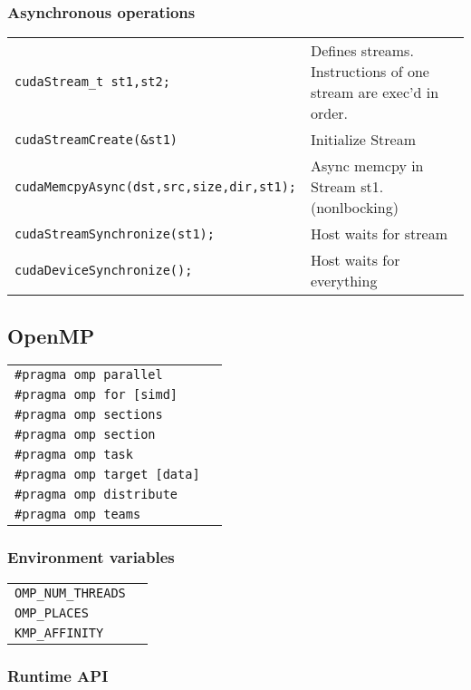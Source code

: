 \documentclass[11pt]{article}
\begin{document}
\subsubsection{Asynchronous operations}
\begin{tabular}{ p{7cm} l }
	\lstinline$cudaStream_t st1,st2;$ & Defines streams. Instructions of one stream are exec'd in order.\\
	\lstinline$cudaStreamCreate(&st1)$& Initialize Stream\\
	\lstinline$cudaMemcpyAsync(dst,src,size,dir,st1);$& Async memcpy in Stream st1. (nonlbocking)\\
	\lstinline$cudaStreamSynchronize(st1);$ & Host waits for stream\\
	\lstinline$cudaDeviceSynchronize();$ & Host waits for everything \\
\end{tabular}

\subsection{OpenMP}

\begin{tabular}{ p{7cm} l }
	\lstinline$#pragma omp parallel$ & \\
	\lstinline$#pragma omp for [simd]$ & \\
	\lstinline$#pragma omp sections$ & \\
	\lstinline$#pragma omp section$ & \\
	\lstinline$#pragma omp task$ & \\
	\lstinline$#pragma omp target [data]$ & \\
	\lstinline$#pragma omp distribute$ & \\
	\lstinline$#pragma omp teams$ & \\ 
\end{tabular}

\subsubsection{Environment variables}

\begin{tabular}{ p{7cm} l }
	\lstinline$OMP_NUM_THREADS$ & \\
	\lstinline$OMP_PLACES$ & \\
	\lstinline$KMP_AFFINITY$ & \\
\end{tabular}

\subsubsection{Runtime API}
\end{document}
